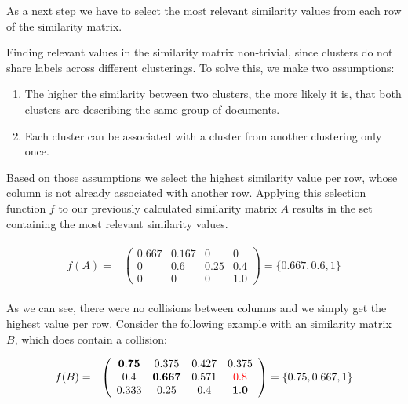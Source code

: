 As a next step we have to select the most relevant similarity values from each row of the similarity matrix. 

Finding relevant values in the similarity matrix non-trivial, since clusters do not share labels across different clusterings. To solve this, we make two assumptions:
\begin{enumerate} 
\item The higher the similarity between two clusters, the more likely it is, that both clusters are describing the same group of documents. 
\item Each cluster can be associated with a cluster from another clustering only once.
\end{enumerate}

Based on those assumptions we select the highest similarity value per row, whose column is not already associated with another row. Applying this selection function $f$ to our previously calculated similarity matrix $A$ results in the set containing the most relevant similarity values.

\begin{gather*}
    \begin{array}{rcl}
        f(A) = & \left(\begin{array}{cccc}
            \mathbf{0.667} & 0.167 & 0 & 0 \\
            0 & \mathbf{0.6} & 0.25 & 0.4 \\
            0 &  0 & 0 & \mathbf{1.0} \end{array}\right)
            = \{0.667, 0.6, 1\}
    \end{array}
\end{gather*}

As we can see, there were no collisions between columns and we simply get the highest value per row. Consider the following example with an similarity matrix $B$, which does contain a collision:

\begin{gather*}
    \begin{array}{rcl}
        f(B) = & \left(\begin{array}{cccc}
            \mathbf{0.75} & 0.375 & 0.427 & 0.375 \\
            0.4 & \mathbf{0.667} & 0.571 & \textcolor{red}{0.8} \\
            0.333 &  0.25 & 0.4 & \mathbf{1.0} \end{array}\right)
            = \{0.75, 0.667, 1\}
    \end{array}
\end{gather*}

